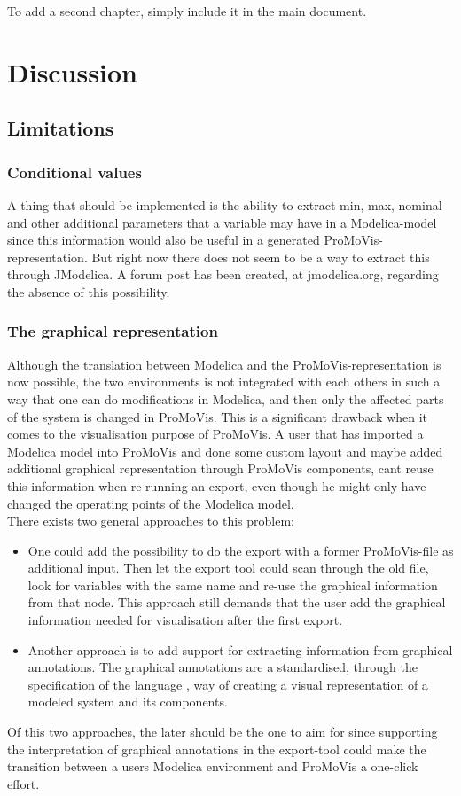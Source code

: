 To add a second chapter, simply include it in the main document.

\section{Discussion}
\subsection{Limitations}


\subsubsection{Conditional values}
A thing that should be implemented is the ability to extract min, max, nominal and other additional parameters that a variable may have in a Modelica-model since this information would also be useful in a generated ProMoVis-representation. But right now there does not seem to be a way to extract this through JModelica. A forum post has been created, at jmodelica.org, regarding the absence of this possibility.
\subsubsection{The graphical representation}
Although the translation between Modelica and the ProMoVis-representation is now possible, the two environments is not integrated with each others in such a way that one can do modifications in Modelica, and then only the affected parts of the system is changed in ProMoVis. This is a significant drawback when it comes to the visualisation purpose of ProMoVis. A user that has imported a Modelica model into ProMoVis and done some custom layout and maybe added additional graphical representation through ProMoVis components, cant reuse this information when re-running an export, even though he might only have changed the operating points of the Modelica model.\\\newline There exists two general approaches to this problem: 
\begin{itemize}
\item One could add the possibility to do the export with a former ProMoVis-file as additional input. Then let the export tool could scan through the old file, look for variables with the same name and re-use the graphical information from that node. This approach still demands that the user add the graphical information needed for visualisation after the first export.
\item Another approach is to add support for extracting information from graphical annotations. The graphical annotations are a standardised, through the specification of the language \cite{ModelicaSpec}\nocite{*}, way of creating a visual representation of a modeled system and its components.
\end{itemize}Of this two approaches, the later should be the one to aim for since supporting the interpretation of graphical annotations in the export-tool could make the transition between a users Modelica environment and ProMoVis a one-click effort. 
